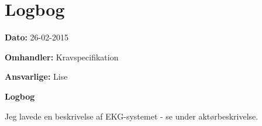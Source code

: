 \chapter{Logbog}

\textbf{Dato:} 26-02-2015

\textbf{Omhandler:} Kravspecifikation

\textbf{Ansvarlige:} Lise

\textbf{Logbog}

Jeg lavede en beskrivelse af EKG-systemet - se under aktørbeskrivelse. 